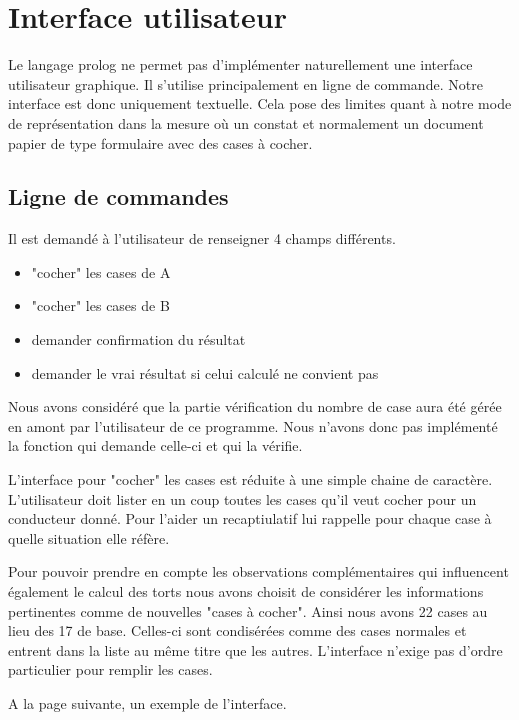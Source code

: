 \chapter{Interface utilisateur}

Le langage prolog ne permet pas d'implémenter naturellement une interface utilisateur graphique. Il s'utilise principalement en ligne de commande. Notre interface est donc uniquement textuelle. Cela pose des limites quant à notre mode de représentation dans la mesure où un constat et normalement un document papier de type formulaire avec des cases à cocher.

\section{Ligne de commandes}

Il est demandé à l'utilisateur de renseigner 4 champs différents.
\begin{itemize}
\item "cocher" les cases de A
\item "cocher" les cases de B
\item demander confirmation du résultat
\item demander le vrai résultat si celui calculé ne convient pas
\end{itemize}

Nous avons considéré que la partie vérification du nombre de case aura été gérée en amont par l'utilisateur de ce programme. Nous n'avons donc pas implémenté la fonction qui demande celle-ci et qui la vérifie.

L'interface pour "cocher" les cases est réduite à une simple chaine de caractère. L'utilisateur doit lister en un coup toutes les cases qu'il veut cocher pour un conducteur donné. Pour l'aider un recaptiulatif lui rappelle pour chaque case à quelle situation elle réfère.

Pour pouvoir prendre en compte les observations complémentaires qui influencent également le calcul des torts nous avons choisit de considérer les informations pertinentes comme de nouvelles "cases à cocher". Ainsi nous avons 22 cases au lieu des 17 de base.
Celles-ci sont condisérées comme des cases normales et entrent dans la liste au même titre que les autres.
L'interface n'exige pas d'ordre particulier pour remplir les cases.

A la page suivante, un exemple de l'interface.

